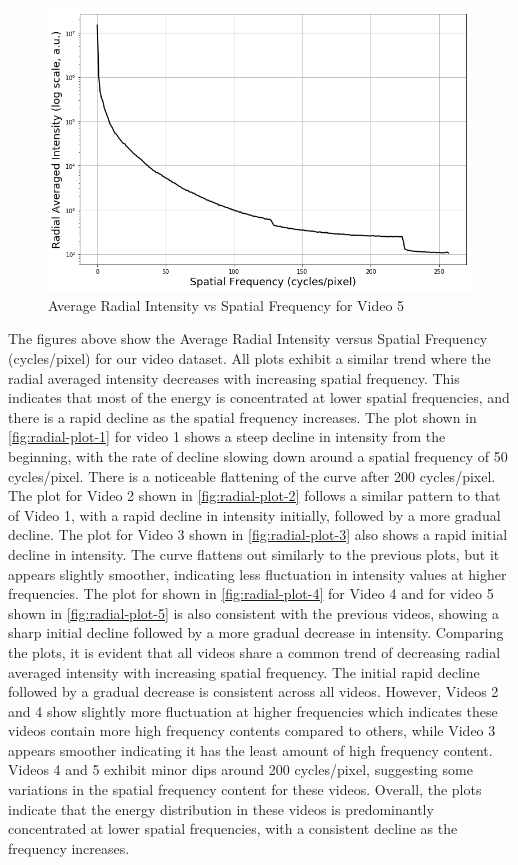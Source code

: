 \documentclass{ioereport}
\begin{document}
\begin{figure}[H]
    \centering
    \includegraphics[width=\linewidth]{assets/video_radial_plots/long.png}
    \caption{Average Radial Intensity vs Spatial Frequency for Video 5}
    \label{fig:radial-plot-5}
\end{figure}


The figures above show the Average Radial Intensity versus Spatial Frequency (cycles/pixel) for our video dataset. All plots exhibit a similar trend where the radial averaged intensity decreases with increasing spatial frequency. This indicates that most of the energy is concentrated at lower spatial frequencies, and there is a rapid decline as the spatial frequency increases. The plot shown in \autoref{fig:radial-plot-1} for video 1 shows a steep decline in intensity from the beginning, with the rate of decline slowing down around a spatial frequency of 50 cycles/pixel. There is a noticeable flattening of the curve after 200 cycles/pixel. The plot for Video 2 shown in \autoref{fig:radial-plot-2} follows a similar pattern to that of Video 1, with a rapid decline in intensity initially, followed by a more gradual decline. The plot for Video 3 shown in \autoref{fig:radial-plot-3} also shows a rapid initial decline in intensity. The curve flattens out similarly to the previous plots, but it appears slightly smoother, indicating less fluctuation in intensity values at higher frequencies. The plot for shown in \autoref{fig:radial-plot-4} for Video 4 and for video 5 shown in \autoref{fig:radial-plot-5} is also consistent with the previous videos, showing a sharp initial decline followed by a more gradual decrease in intensity. Comparing the plots, it is evident that all videos share a common trend of decreasing radial averaged intensity with increasing spatial frequency. The initial rapid decline followed by a gradual decrease is consistent across all videos. However, Videos 2 and 4 show slightly more fluctuation at higher frequencies which indicates these videos contain more high frequency contents compared to others, while Video 3 appears smoother indicating it has the least amount of high frequency content. Videos 4 and 5 exhibit minor dips around 200 cycles/pixel, suggesting some variations in the spatial frequency content for these videos. Overall, the plots indicate that the energy distribution in these videos is predominantly concentrated at lower spatial frequencies, with a consistent decline as the frequency increases.
\end{document}
